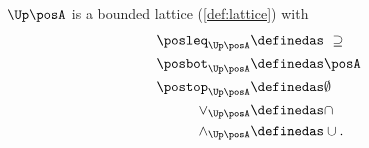 \begin{lemma}
    \label{lem:u_bounded_lat}
    $\Up \posA$ is a bounded lattice (\cref{def:lattice}) with
    \begin{equation}
        \begin{aligned}
            \posleq_{\Up \posA} & \definedas \ \supseteq \\
            \posbot_{\Up \posA} & \definedas \posA       \\
            \postop_{\Up \posA} & \definedas \emptyset   \\
            \vee_{\Up \posA}    & \definedas \cap        \\
            \wedge_{\Up \posA}  & \definedas \cup.       
        \end{aligned}
    \end{equation}
\end{lemma}
